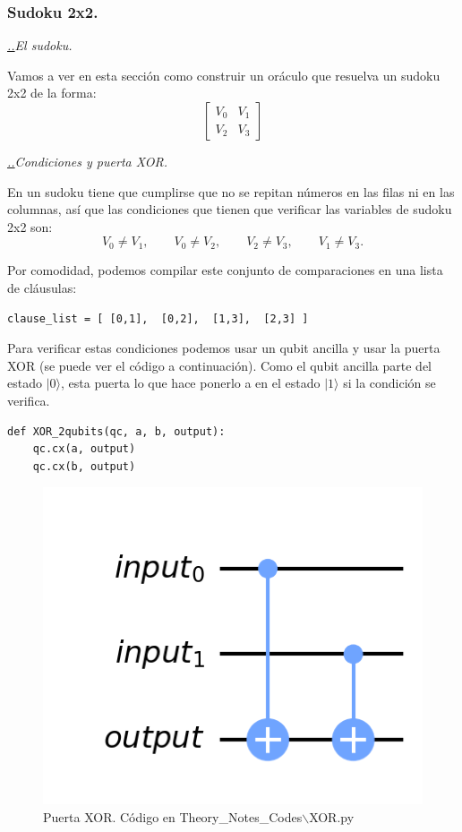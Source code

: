 \documentclass[a4paper,11pt]{article} %
\numberwithin{equation}{section}
\def\lc{\left[}
\def\rc{\right]}
\newcounter{subsubsubsection}[subsubsection]
\def\subsubii{\par\addtocounter{subsubsubsection}{1}\underline{\it 
\thesubsubsection.\thesubsubsubsection.}\hskip0.5cm}
\begin{document}
\subsubsection{Sudoku 2x2. }

			\subsubii \textit{El sudoku.} 

Vamos a ver en esta sección como construir un oráculo que resuelva un sudoku 2x2 de la forma:
\begin{equation}
	\lc
	\begin{matrix}
	V_0 & V_1 \\
	V_2 & V_3
	\end{matrix}
	\rc
\end{equation}

			\subsubii \textit{Condiciones y puerta XOR.}
			 
En un sudoku tiene que cumplirse que no se repitan números en las filas ni en las columnas, así que las condiciones que tienen que verificar las variables de sudoku 2x2 son:
\begin{equation}
V_0 \neq V_1, \qquad 
V_0 \neq V_2, \qquad
V_2 \neq V_3, \qquad
V_1 \neq V_3.
\end{equation}

Por comodidad, podemos compilar este conjunto de comparaciones en una lista de cláusulas:
\begin{lstlisting}
clause_list = [ [0,1],  [0,2],  [1,3],  [2,3] ]
\end{lstlisting}
Para verificar estas condiciones podemos usar un qubit ancilla y usar la puerta XOR (se puede ver el código a continuación). Como el qubit ancilla parte del estado $|0\rangle$, esta puerta lo que hace ponerlo a en el estado $|1\rangle$ si la condición se verifica.

\begin{lstlisting}
def XOR_2qubits(qc, a, b, output):
    qc.cx(a, output)
    qc.cx(b, output)
\end{lstlisting}

	\begin{figure}[H]
	\centering 
	\includegraphics[width=0.25\linewidth]{Theory_Notes_Codes/Fig_Imple_xor.png}
	\caption{Puerta XOR. Código en Theory\_Notes\_Codes$\backslash$XOR.py}
	\label{Fig_Imple_xor}
	\end{figure}
\end{document}
